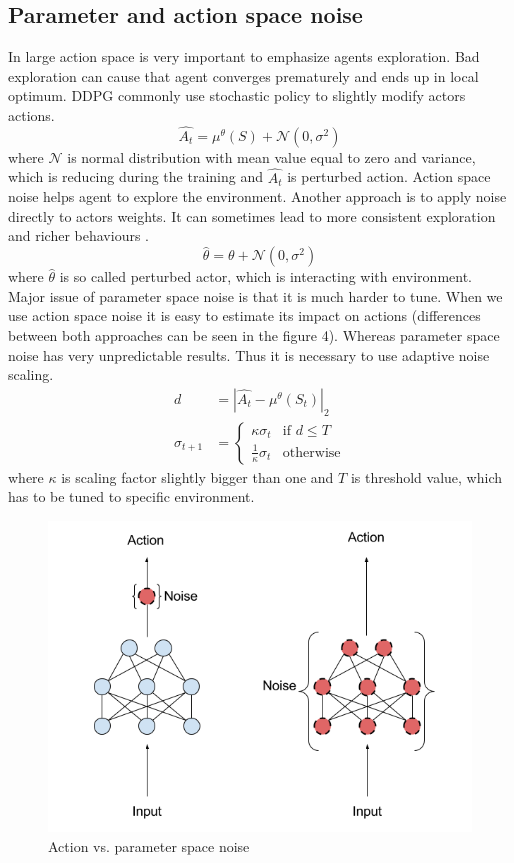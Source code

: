 \subsection{Parameter and action space noise}
In large action space is very important to emphasize agents exploration. Bad exploration can cause that agent converges prematurely and ends up in local optimum. DDPG commonly use stochastic policy to slightly modify actors actions.
\begin{equation}
\hat{A_t} = \mu^\theta(S) + \mathcal{N}(0, \sigma^2)
\end{equation}
where $\mathcal{N}$ is normal distribution with mean value equal to zero and variance, which is reducing during the training and $\hat{A_t}$ is perturbed action. Action space noise helps agent to explore the environment. Another approach is to apply noise directly to actors weights. It can sometimes lead to more consistent exploration and richer behaviours \cite{plappert2017}.
\begin{equation}
\hat{\theta} = \theta + \mathcal{N}(0, \sigma^2)
\end{equation}
where $\hat{\theta}$ is so called perturbed actor, which is interacting with environment. 
\clearpage
Major issue of parameter space noise is that it is much harder to tune. When we use action space noise it is easy to estimate its impact on actions (differences between both approaches can be seen in the figure 4). Whereas parameter space noise has very unpredictable results. Thus it is necessary to use adaptive noise scaling.
\begin{align}
d &= |\hat{A_t} - \mu^\theta(S_t)|_2  \\
\sigma_{t+1} &= 
     \begin{cases}
       \kappa \sigma_t & \text{if } d \leq T \\
       \frac{1}{\kappa}\sigma_t & \text{otherwise}
     \end{cases}
\end{align}
where $\kappa$ is scaling factor slightly bigger than one and $T$ is threshold value, which has to be tuned to specific environment.

\begin{figure}[!h]
\centering
\includegraphics[scale=0.5]{fig/perturbations.png}
\caption{Action vs. parameter space noise}
\end{figure}

